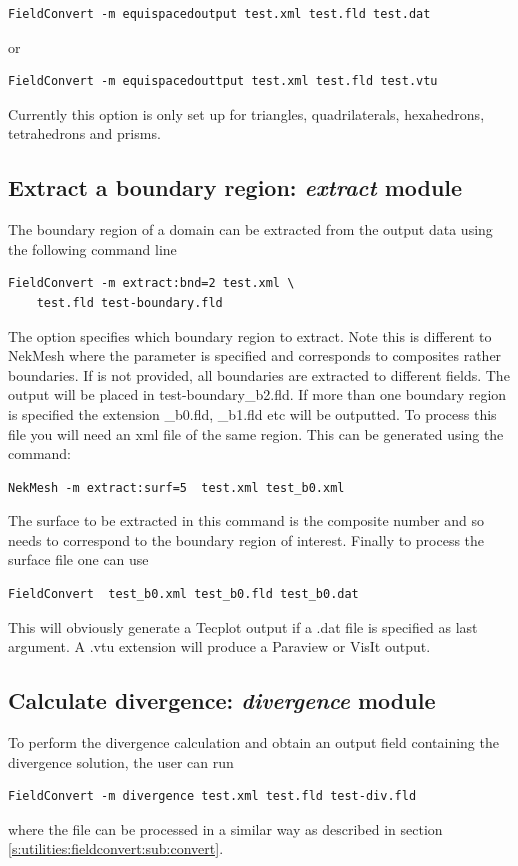 \begin{lstlisting}[style=BashInputStyle]
FieldConvert -m equispacedoutput test.xml test.fld test.dat
\end{lstlisting}

or

\begin{lstlisting}[style=BashInputStyle]
FieldConvert -m equispacedouttput test.xml test.fld test.vtu
\end{lstlisting}


\begin{notebox}
Currently this option is only set up for triangles, quadrilaterals,
hexahedrons, tetrahedrons and prisms.
\end{notebox}

\subsection{Extract a boundary region: \textit{extract} module}
The boundary region of a domain can be extracted from the output
data using the following command line
%
\begin{lstlisting}[style=BashInputStyle]
FieldConvert -m extract:bnd=2 test.xml \
	test.fld test-boundary.fld
\end{lstlisting}
%
The option  specifies which boundary region to extract.
Note this is different to NekMesh where the parameter \inltt{surf}
is specified and corresponds to composites rather boundaries. If 
is not provided, all boundaries are extracted to different fields.
The output will be placed in test-boundary\_b2.fld.
If more than one boundary region is specified the extension \_b0.fld, \_b1.fld etc will be
outputted. To process this file you will need an xml file of the same region.
This can be generated using the command:
%
\begin{lstlisting}[style=BashInputStyle]
NekMesh -m extract:surf=5  test.xml test_b0.xml
\end{lstlisting}
%
The surface to be extracted in this command is the composite
number and so needs to correspond to the boundary region
of interest. Finally to process the surface file one can use
%
\begin{lstlisting}[style=BashInputStyle]
FieldConvert  test_b0.xml test_b0.fld test_b0.dat
\end{lstlisting}
%
This will obviously generate a Tecplot output if a .dat file
is specified as last argument. A .vtu extension will produce
a Paraview or VisIt output.
%
%
%
\subsection{Calculate divergence: \textit{divergence} module}
To perform the divergence calculation and obtain an output
field containing the divergence solution, the user can run
\begin{lstlisting}[style=BashInputStyle]
FieldConvert -m divergence test.xml test.fld test-div.fld
\end{lstlisting}
where the file  can be processed in a similar
way as described in section \ref{s:utilities:fieldconvert:sub:convert}.
%
%
%
